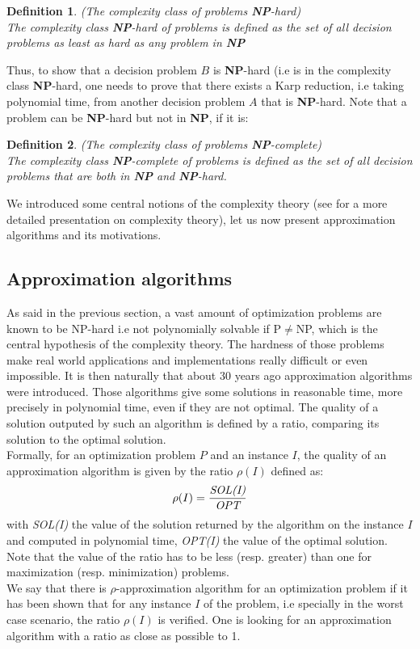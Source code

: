 \documentclass[a4paper]{book}
\newtheorem{definition}{Definition}
\begin{document}
\begin{definition}{\emph{(The complexity class of problems \textbf{NP}-hard)}}\\
The complexity class \emph{\textbf{NP}-hard} of problems is defined as the set of all decision problems as least as hard as any problem in \emph{\textbf{NP}}
\end{definition}

Thus, to show that a decision problem $B$ is \textbf{NP}-hard (i.e is in the complexity class \textbf{NP}-hard, one needs to prove that there exists a Karp reduction, i.e taking polynomial time, from another decision problem $A$ that is \textbf{NP}-hard.  
Note that a problem can be \textbf{NP}-hard but not in \textbf{NP}, if it is:

\begin{definition}{ \emph{(The complexity class of problems \textbf{NP}-complete)}}\\
The complexity class \emph{\textbf{NP}-complete} of problems is defined as the set of all decision problems that are both in \emph{\textbf{NP}} and \emph{\textbf{NP}-hard}.
\end{definition}

We introduced some central notions of the complexity theory (see \cite{gj} for a more detailed presentation on complexity theory), let us now present approximation algorithms and its motivations.


\subsection{Approximation algorithms}
As said in the previous section, a vast amount of optimization problems are known to be NP-hard i.e not polynomially solvable if P$\ne$NP, which is the central hypothesis of the complexity theory. The hardness of those problems make real world applications and implementations really difficult or even impossible. It is then naturally that about 30 years ago approximation algorithms were introduced. Those algorithms give some solutions in reasonable time, more precisely in polynomial time, even if they are not optimal. The quality of a solution outputed by such an algorithm is defined by a ratio, comparing its solution to the optimal solution. \\
Formally, for an optimization problem $P$ and an instance $I$, the quality of an approximation algorithm is given by the ratio $\rho(I)$ defined as: 
$$\rho(I) = \frac{\emph{SOL(I)}}{\emph{OPT}}$$
with \emph{SOL(I)} the value of the solution returned by the algorithm on the instance $I$ and computed in polynomial time, \emph{OPT(I)} the value of the optimal solution. Note that the value of the ratio has to be less (resp. greater) than one for maximization (resp. minimization) problems.\\
We say that there is $\rho$-approximation algorithm for an optimization problem if it has been shown that for any instance $I$ of the problem, i.e specially in the worst case scenario, the ratio $\rho(I)$ is verified. One is looking for an approximation algorithm with a ratio as close as possible to 1. \\
\end{document}
